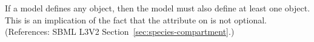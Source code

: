 If a model defines any \Species object, then the model must also define at
least one \Compartment object.  This is an implication of the fact that the
 attribute on \Species is not optional.  (References:
SBML L3V2 Section~\ref{sec:species-compartment}.)
